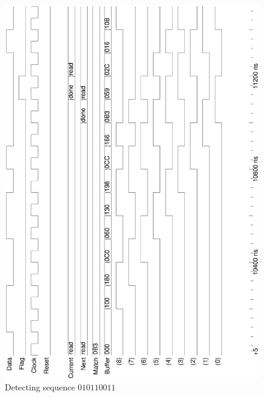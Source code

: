 \documentclass[10pt,a4paper]{report}
\begin{document}
\begin{figure}
\includegraphics[scale=0.49,angle=-90]{graphs/seq_test2.MATCHED.ps}
\caption{\small{Detecting sequence $010110011$}} \label{wave:usd:t2w2}
\end{figure}
\end{document}
